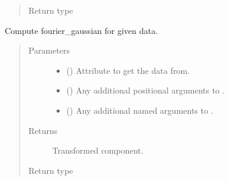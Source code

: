 \documentclass[letterpaper,10pt,english]{sphinxmanual}
\begin{document}
\begin{fulllineitems}
\begin{fulllineitems}
\begin{quote}
\begin{description}
\item[{Return type}] \leavevmode
{\hyperref[\detokenize{api/base_classes:geology.src.base_spatial.SpatialComponent}]{}}

\end{description}\end{quote}

\end{fulllineitems}


\begin{fulllineitems}
\label{\detokenize{api/rock:geology.src.Rock.fourier_gaussian}}
Compute fourier\_gaussian for given data.
\begin{quote}\begin{description}
\item[{Parameters}] \leavevmode\begin{itemize}
\item {} 
 (\sphinxstyleliteralemphasis{\sphinxupquote{, }}) \textendash{} Attribute to get the data from.

\item {} 
 () \textendash{} Any additional positional arguments to .

\item {} 
 () \textendash{} Any additional named arguments to .

\end{itemize}

\item[{Returns}] \leavevmode
{} \textendash{} Transformed component.

\item[{Return type}] \leavevmode
{\hyperref[\detokenize{api/base_classes:geology.src.base_spatial.SpatialComponent}]{}}


\end{description}
\end{quote}
\end{fulllineitems}
\end{fulllineitems}
\end{document}
